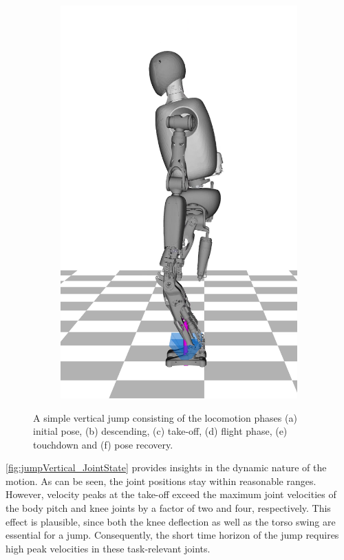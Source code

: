 \begin{figure}
\begin{subfigure}{.16\textwidth}
	\includegraphics[width=1\linewidth]{fig/jumpVertical/snaps/6x}
	\caption{}
\end{subfigure}%
\caption[A simple vertical jump]{A simple vertical jump consisting of the locomotion phases (a) initial pose, (b) descending, (c) take-off, (d) flight phase, (e) touchdown and (f) pose recovery.}
\label{fig:jumpVertical_Snaps}
\end{figure} 

\cref{fig:jumpVertical_JointState} provides insights in the dynamic nature of the motion. As can be seen, the joint positions stay within reasonable ranges. However, velocity peaks at the take-off exceed the maximum joint velocities of the body pitch and knee joints by a factor of two and four, respectively. This effect is plausible, since both the knee deflection as well as the torso swing are essential for a jump. Consequently, the short time horizon of the jump requires high peak velocities in these task-relevant joints. 

